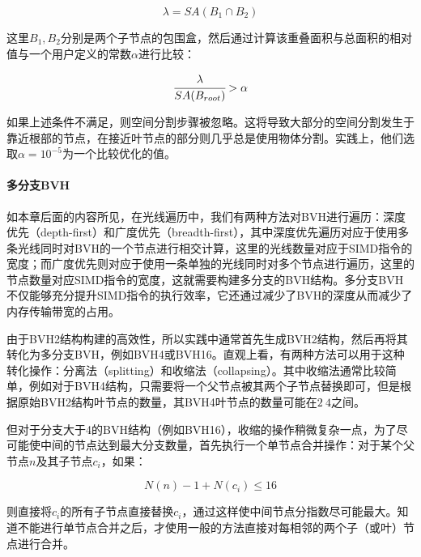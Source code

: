 \begin{equation}
	\lambda=SA(B_1\cap B_2)
\end{equation}

\noindent 这里$B_1,B_2$分别是两个子节点的包围盒，然后通过计算该重叠面积与总面积的相对值与一个用户定义的常数$\alpha$进行比较：

\begin{equation}
	 \cfrac{\lambda}{SA(B_{root})}>\alpha
\end{equation}

\noindent 如果上述条件不满足，则空间分割步骤被忽略。这将导致大部分的空间分割发生于靠近根部的节点，在接近叶节点的部分则几乎总是使用物体分割。实践上，他们选取$\alpha=10^{-5}$为一个比较优化的值。







\paragraph{多分支BVH}
如本章后面的内容所见，在光线遍历中，我们有两种方法对BVH进行遍历：深度优先（depth-first）和广度优先（breadth-first），其中深度优先遍历对应于使用多条光线同时对BVH的一个节点进行相交计算，这里的光线数量对应于SIMD指令的宽度；而广度优先则对应于使用一条单独的光线同时对多个节点进行遍历，这里的节点数量对应SIMD指令的宽度，这就需要构建多分支的BVH结构。多分支BVH不仅能够充分提升SIMD指令的执行效率，它还通过减少了BVH的深度从而减少了内存传输带宽的占用。

由于BVH2结构构建的高效性，所以实践中通常首先生成BVH2结构，然后再将其转化为多分支BVH，例如BVH4或BVH16。直观上看，有两种方法可以用于这种转化操作：分离法（splitting）和收缩法（collapsing）。其中收缩法通常比较简单，例如对于BVH4结构\cite{a:EfficientRayTracingKernelsforModernCPUArchitectures}，只需要将一个父节点被其两个子节点替换即可，但是根据原始BVH2结构叶节点的数量，其BVH4叶节点的数量可能在$2~4$之间。

但对于分支大于4的BVH结构（例如BVH16），收缩的操作稍微复杂一点，为了尽可能使中间的节点达到最大分支数量，\cite{a:GettingRidofPackets}首先执行一个单节点合并操作：对于某个父节点$n$及其子节点$c_i$，如果：

\begin{equation}
	N(n)-1+N(c_i)\leq 16
\end{equation}

\noindent 则直接将$c_i$的所有子节点直接替换$c_i$，通过这样使中间节点分指数尽可能最大。知道不能进行单节点合并之后，才使用一般的方法直接对每相邻的两个子（或叶）节点进行合并。

